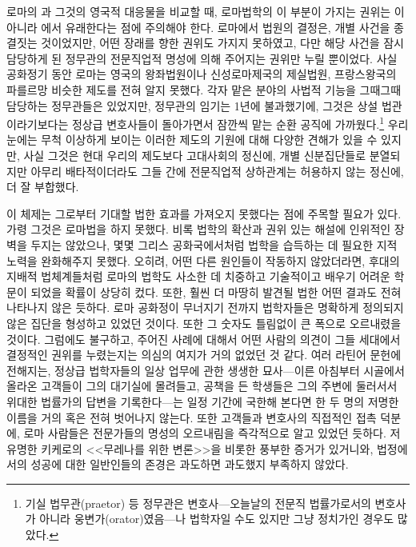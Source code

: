 로마의 과 그것의 영국적 대응물을 비교할 때,
로마법학의 이 부분이 가지는 권위는 이 아니라
에서 유래한다는 점에 주의해야 한다.
로마에서 법원의 결정은, 개별 사건을 종결짓는 것이었지만,
어떤 장래를 향한 권위도 가지지 못하였고, 다만
해당 사건을 잠시 담당하게 된 정무관의 전문직업적 명성에 의해 주어지는
권위만 누릴 뿐이었다.
사실 공화정기 동안 로마는 영국의 왕좌법원이나
신성로마제국의 제실법원,
프랑스왕국의 파를르망 비슷한 제도를 전혀 알지 못했다.
각자 맡은 분야의 사법적 기능을 그때그때 담당하는 정무관들은 있었지만,
정무관의 임기는 1년에 불과했기에, 그것은 상설 법관이라기보다는
정상급 변호사들이 돌아가면서 잠깐씩 맡는 순환 공직에 가까웠다.\footnote{%
  기실
  법무관(praetor) 등 정무관은 변호사---오늘날의 전문직 법률가로서의
  변호사가 아니라 웅변가(orator)였음---나 법학자일 수도 있지만
  그냥 정치가인 경우도 많았다.}
우리 눈에는 무척 이상하게 보이는 이러한 제도의 기원에 대해 다양한 견해가 있을 수 있지만,
사실 그것은 현대 우리의 제도보다 고대사회의 정신에,
개별 신분집단들로 분열되지만 아무리 배타적이더라도
그들 간에 전문직업적 상하관계는 허용하지 않는 정신에, 더 잘 부합했다.

이 체제는 그로부터 기대할 법한 효과를 가져오지 못했다는 점에 주목할 필요가 있다.
가령 그것은 로마법을 하지 못했다.
비록 법학의 확산과 권위 있는 해설에 인위적인 장벽을 두지는 않았으나,
몇몇 그리스 공화국에서처럼 법학을 습득하는 데 필요한 지적 노력을 완화해주지 못했다.
오히려, 어떤 다른 원인들이 작동하지 않았더라면, 후대의 지배적 법체계들처럼 로마의 법학도
사소한 데 치중하고 기술적이고 배우기 어려운 학문이 되었을 확률이 상당히 컸다.
또한, 훨씬 더 마땅히 발견될 법한 어떤 결과도 전혀 나타나지 않은 듯하다.
로마 공화정이 무너지기 전까지 법학자들은 명확하게 정의되지 않은 집단을 형성하고 있었던 것이다.
또한 그 숫자도 틀림없이 큰 폭으로 오르내렸을 것이다.
그럼에도 불구하고, 주어진 사례에 대해서 어떤 사람의 의견이 그들 세대에서 결정적인 권위를
누렸는지는 의심의 여지가 거의 없었던 것 같다.
여러 라틴어 문헌에 전해지는, 정상급 법학자들의 일상 업무에 관한
생생한 묘사---이른 아침부터
시골에서 올라온 고객들이 그의 대기실에 몰려들고,
공책을 든 학생들은 그의 주변에 둘러서서 위대한
법률가의 답변을 기록한다---는 일정 기간에 국한해 본다면
한 두 명의 저명한 이름을 거의 혹은 전혀 벗어나지 않는다.
또한 고객들과 변호사의 직접적인 접촉 덕분에,
로마 사람들은 전문가들의 명성의 오르내림을 즉각적으로 알고 있었던 듯하다.
저 유명한 키케로의 <<무레나를 위한 변론>>을 비롯한 풍부한 증거가
있거니와, 법정에서의 성공에 대한 일반인들의 존경은 과도하면 과도했지 부족하지 않았다.

